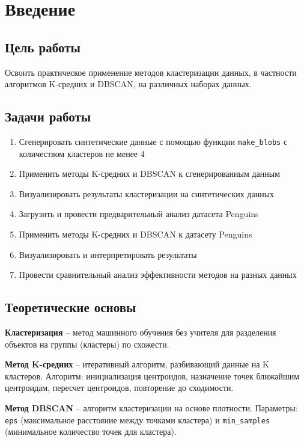 \documentclass[12pt,a4paper]{report}
\begin{document}
\chapter{Введение}

\section{Цель работы}
Освоить практическое применение методов кластеризации данных, в частности алгоритмов K-средних и DBSCAN, на различных наборах данных.

\section{Задачи работы}
\begin{enumerate}
    \item Сгенерировать синтетические данные с помощью функции \texttt{make\_blobs} с количеством кластеров не менее 4
    \item Применить методы K-средних и DBSCAN к сгенерированным данным
    \item Визуализировать результаты кластеризации на синтетических данных
    \item Загрузить и провести предварительный анализ датасета Penguins
    \item Применить методы K-средних и DBSCAN к датасету Penguins
    \item Визуализировать и интерпретировать результаты
    \item Провести сравнительный анализ эффективности методов на разных данных
\end{enumerate}

\section{Теоретические основы}

\textbf{Кластеризация} -- метод машинного обучения без учителя для разделения объектов на группы (кластеры) по схожести.

\textbf{Метод K-средних} -- итеративный алгоритм, разбивающий данные на K кластеров. Алгоритм: инициализация центроидов, назначение точек ближайшим центроидам, пересчет центроидов, повторение до сходимости.

\textbf{Метод DBSCAN} -- алгоритм кластеризации на основе плотности. Параметры: \texttt{eps} (максимальное расстояние между точками кластера) и \texttt{min\_samples} (минимальное количество точек для кластера).
\end{document}
